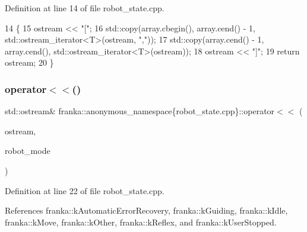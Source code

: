 Definition at line 14 of file robot\+\_\+state.\+cpp.


\begin{DoxyCode}
14                                                                          \{
15   ostream << \textcolor{stringliteral}{"["};
16   std::copy(array.cbegin(), array.cend() - 1, std::ostream\_iterator<T>(ostream, \textcolor{stringliteral}{","}));
17   std::copy(array.cend() - 1, array.cend(), std::ostream\_iterator<T>(ostream));
18   ostream << \textcolor{stringliteral}{"]"};
19   \textcolor{keywordflow}{return} ostream;
20 \}
\end{DoxyCode}
\mbox{\label{namespacefranka_1_1anonymous__namespace_02robot__state_8cpp_03_a2cbd43861678488f626f5e01c62b8cc2}} 
\subsubsection{\texorpdfstring{operator$<$$<$()}{operator<<()}\hspace{0.1cm}{\footnotesize\ttfamily [2/2]}}
{\footnotesize\ttfamily std\+::ostream\& franka\+::anonymous\+\_\+namespace\{robot\+\_\+state.\+cpp\}\+::operator$<$$<$ (\begin{DoxyParamCaption}\item[{std\+::ostream \&}]{ostream,  }\item[{const \hyperlink{namespacefranka_adfe059ae23ebbad59e421edaa879651a}{Robot\+Mode}}]{robot\+\_\+mode }\end{DoxyParamCaption})}



Definition at line 22 of file robot\+\_\+state.\+cpp.



References franka\+::k\+Automatic\+Error\+Recovery, franka\+::k\+Guiding, franka\+::k\+Idle, franka\+::k\+Move, franka\+::k\+Other, franka\+::k\+Reflex, and franka\+::k\+User\+Stopped.


